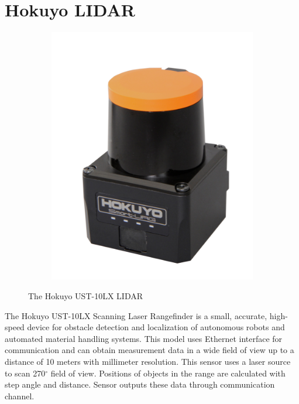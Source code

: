 \documentclass[times, utf8, diplomski, english]{fer}
\begin{document}
\section{Hokuyo LIDAR}
\begin{figure}[h!]
    \centering
        \begin{subfigure}[t]{0.2\textwidth}
        \includegraphics[width=\textwidth]{hokuyo_pic}
    \end{subfigure}
    \caption{The Hokuyo UST-10LX LIDAR}\label{fig:ur10}
\end{figure}
The Hokuyo UST-10LX Scanning Laser Rangefinder is a small, accurate, high-speed device for obstacle detection and localization of autonomous robots and automated material handling systems. 
This model uses Ethernet interface for communication and can obtain measurement data in a wide field of view up to a distance of 10 meters with millimeter resolution.
This sensor uses a laser source to scan 270$^\circ$ field of view. Positions of objects in the range are calculated with step angle and distance. Sensor outputs these data through communication channel.
\newpage
\end{document}
